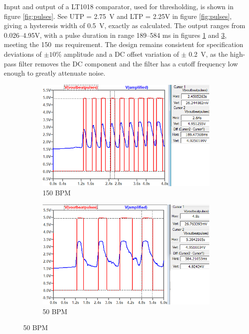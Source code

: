 Input and output of a LT1018 comparator, used for thresholding, is shown in figure \ref{fig:pulses}.  See UTP = \SI{2.75}{V} and LTP = {2.25}{V} in figure \ref{fig:pulses}, giving a hysteresis width of \SI{0.5}{V}, exactly as calculated. The output ranges from \numrange{0.026}{4.95}\si{V}, with a pulse duration in range \numrange{189}{584} \si{ms} in figures \ref{subfig:pulses2} and \ref{subfig:pulses1}, meeting the \SI{150}{ms} requirement. The design remains consistent for specification deviations of $\pm 10\%$ amplitude and a DC offset variation of $\pm$ \SI{0.2}{V}, as the high-pass filter removes the DC component and the filter has a cutoff frequency low enough to greatly attenuate noise.

\begin{figure}[h]
 \footnotesize
   \centering
   \begin{subfigure}[]{0.49\textwidth} 	 
  	 \includegraphics[width=\linewidth]{./Figures/pulses2}
	  \caption{150 BPM} 
	  \label{subfig:pulses2}	
   \end{subfigure}
   \begin{subfigure}[]{0.49\textwidth}
        \includegraphics[width=\linewidth]{./Figures/pulses1}
	  \caption{50 BPM} 
	  \label{subfig:pulses1}	
   \end{subfigure}
 \end{figure}

